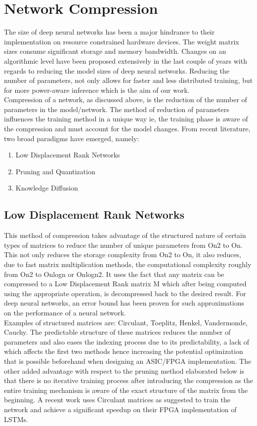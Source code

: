 \chapter{Network Compression}
The size of deep neural networks has been a major hindrance to their implementation on resource constrained hardware devices. The weight matrix sizes consume significant storage and memory bandwidth. Changes on an algorithmic level have been proposed extensively in the last couple of years with regards to reducing the model sizes of deep neural networks. Reducing the number of parameters, not only allows for faster and less distributed training, but for more power-aware inference which is the aim of our work.\\
Compression of a network, as discussed above, is the reduction of the number of parameters in the model/network. The method of reduction of parameters influences the training method in a unique way ie, the training phase is aware of the compression and must account for the model changes. From recent literature, two broad paradigms have emerged, namely:
\begin{enumerate}
    \item Low Displacement Rank Networks
    \item Pruning and Quantization
    \item Knowledge Diffusion
\end{enumerate}

\section{Low Displacement Rank Networks}

This method of compression takes advantage of the structured nature of certain types of matrices to reduce the number of unique parameters from On2 to On. This not only reduces the storage complexity from On2 to On, it also reduces, due to fast matrix multiplication methods, the computational complexity roughly from On2 to Onlogn or Onlogn2. It uses the fact that any matrix can be compressed to a Low Displacement Rank matrix M which after being computed using the appropriate operation, is decompressed back to the desired result. For deep neural networks, an error bound has been proven for such approximations on the performance of a neural network. \\
Examples of structured matrices are: Circulant, Toeplitz, Henkel, Vandermonde, Cauchy. The predictable structure of these matrices reduces the number of parameters and also eases the indexing process due to its predictability, a lack of which affects the first two methods hence increasing the potential optimization that is possible beforehand when designing an ASIC/FPGA implementation. The other added advantage with respect to the pruning method elaborated below is that there is no iterative training process after introducing the compression as the entire training mechanism is aware of the exact structure of the matrix from the beginning. A recent work uses Circulant matrices as suggested to train the network and achieve a significant speedup on their FPGA implementation of LSTMs.


